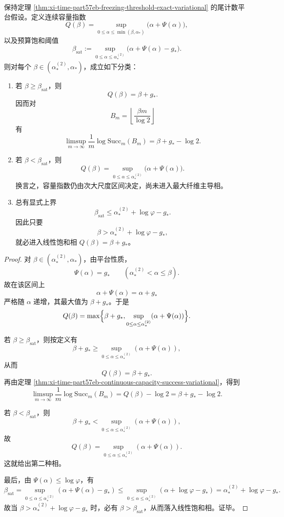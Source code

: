 \begin{theorem}\label{thm:xi-time-part57eb-oracle-escort-double-frontier}
保持定理 \ref{thm:xi-time-part57eb-freezing-threshold-exact-variational} 的尾计数平台假设。定义连续容量指数
\[
Q(\beta)=\sup_{0\le \alpha\le \min(\beta,\alpha_*)}\bigl(\alpha+\Psi(\alpha)\bigr),
\]
以及预算饱和阈值
\[
\beta_{\mathrm{sat}}
:=
\sup_{0\le \alpha\le \alpha_*^{(2)}}\bigl(\alpha+\Psi(\alpha)-g_*\bigr).
\]
则对每个 \(\beta\in(\alpha_*^{(2)},\alpha_*)\)，成立如下分类：
\begin{enumerate}
  \item 若 \(\beta\ge \beta_{\mathrm{sat}}\)，则
  \[
  \boxed{\;
  Q(\beta)=\beta+g_*.\;}
  \]
  因而对
  \[
  B_m=\left\lfloor \frac{\beta m}{\log 2}\right\rfloor
  \]
  有
  \[
  \limsup_{m\to\infty}\frac1m\log \mathrm{Succ}_m(B_m)
  =
  \beta+g_*-\log 2.
  \]
  \item 若 \(\beta<\beta_{\mathrm{sat}}\)，则
  \[
  \boxed{\;
  Q(\beta)=
  \sup_{0\le \alpha\le \alpha_*^{(2)}}\bigl(\alpha+\Psi(\alpha)\bigr).\;}
  \]
  换言之，容量指数仍由次大尺度区间决定，尚未进入最大纤维主导相。
  \item 总有显式上界
  \[
  \boxed{\;
  \beta_{\mathrm{sat}}
  \le
  \alpha_*^{(2)}+\log\varphi-g_*.\;}
  \]
  因此只要
  \[
  \beta>\alpha_*^{(2)}+\log\varphi-g_*,
  \]
  就必进入线性饱和相 \(Q(\beta)=\beta+g_*\)。
\end{enumerate}
\end{theorem}
\begin{proof}
对 \(\beta\in(\alpha_*^{(2)},\alpha_*)\)，由平台性质，
\[
\Psi(\alpha)=g_*
\qquad
(\alpha_*^{(2)}<\alpha\le \beta).
\]
故在该区间上
\[
\alpha+\Psi(\alpha)=\alpha+g_*
\]
严格随 \(\alpha\) 递增，其最大值为 \(\beta+g_*\)。于是
\[
Q(\beta)
=
\max\Bigl\{
\beta+g_*,
\sup_{0\le \alpha\le \alpha_*^{(2)}}(\alpha+\Psi(\alpha))
\Bigr\}.
\]

若 \(\beta\ge \beta_{\mathrm{sat}}\)，则按定义有
\[
\beta+g_*
\ge
\sup_{0\le \alpha\le \alpha_*^{(2)}}(\alpha+\Psi(\alpha)),
\]
从而
\[
Q(\beta)=\beta+g_*.
\]
再由定理 \ref{thm:xi-time-part57eb-continuous-capacity-success-variational}，得到
\[
\limsup_{m\to\infty}\frac1m\log \mathrm{Succ}_m(B_m)
=
Q(\beta)-\log 2
=
\beta+g_*-\log 2.
\]

若 \(\beta<\beta_{\mathrm{sat}}\)，则
\[
\beta+g_*
<
\sup_{0\le \alpha\le \alpha_*^{(2)}}(\alpha+\Psi(\alpha)),
\]
故
\[
Q(\beta)=
\sup_{0\le \alpha\le \alpha_*^{(2)}}(\alpha+\Psi(\alpha)).
\]
这就给出第二种相。

最后，由 \(\Psi(\alpha)\le \log\varphi\)，有
\[
\beta_{\mathrm{sat}}
=
\sup_{0\le \alpha\le \alpha_*^{(2)}}(\alpha+\Psi(\alpha)-g_*)
\le
\sup_{0\le \alpha\le \alpha_*^{(2)}}(\alpha+\log\varphi-g_*)
=
\alpha_*^{(2)}+\log\varphi-g_*.
\]
故当
\(
\beta>\alpha_*^{(2)}+\log\varphi-g_*
\)
时，必有 \(\beta>\beta_{\mathrm{sat}}\)，从而落入线性饱和相。证毕。
\end{proof}

\endinput
